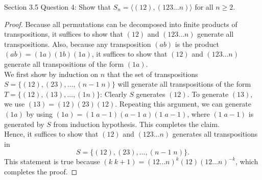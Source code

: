 Section 3.5 Question 4:
Show that $S_n=\langle(12),(123\ldots n)\rangle$ for all $n\geq2$.
\begin{proof}
  Because all permutations can be decomposed into finite products of
  transpositions, it suffices to show that $(12)$ and $(123\ldots n)$
  generate all transpositions. Also, because any transposition $(ab)$ is
  the product $(ab)=(1a)(1b)(1a)$, it suffices to show that $(12)$ and
  $(123\ldots n)$ generate all transpositions of the form $(1a)$. \\
  
  We first show by induction on $n$ that the set of transpositions
  $S=\{(12),(23),\ldots,(n-1\;n)\}$ will generate all transpositions of the
  form $T=\{(12),(13),\ldots,(1n)\}$: Clearly $S$ generates $(12)$. To
  generate $(13)$, we use $(13)=(12)(23)(12)$. Repeating this argument, we
  can generate $(1a)$ by using $(1a)=(1\;a-1)(a-1\;a)(1\;a-1)$, where
  $(1\;a-1)$ is generated by $S$ from induction hypothesis. This completes
  the claim. \\

  Hence, it suffices to show that $(12)$ and $(123\ldots n)$ generates all
  transpositions in \[S=\{(12),(23),\ldots,(n-1\;n)\}.\] This statement is
  true because $(k\;k+1)=(12\ldots n)^{k}(12)(12\ldots n)^{-k}$, which
  completes the proof.
\end{proof}
